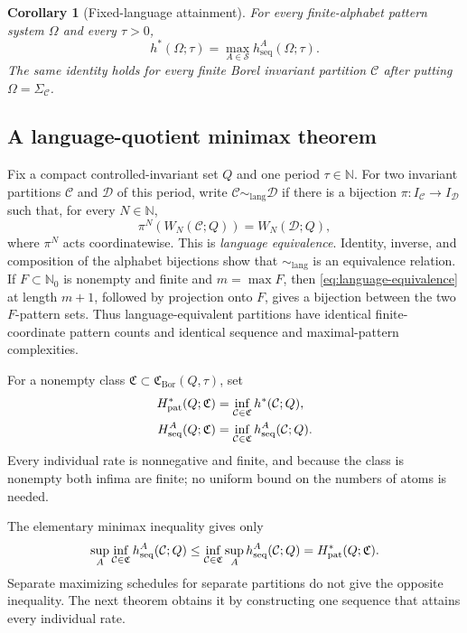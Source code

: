 \documentclass[11pt,reqno]{amsart}
\numberwithin{equation}{section}
\newtheorem{corollary}[theorem]{Corollary}
\theoremstyle{definition}
\newcommand{\N}{\mathbb N}
\newcommand{\Nzero}{\mathbb N_0}
\newcommand{\C}{\mathcal C}
\newcommand{\D}{\mathcal D}
\newcommand{\hseq}{h_{\mathrm{seq}}}
\newcommand{\hpat}{h^{*}}
\newcommand{\Bor}{\mathrm{Bor}}
\newcommand{\lang}{\mathrm{lang}}
\begin{document}
\begin{corollary}[Fixed-language attainment]\label{cor:fixed}
For every finite-alphabet pattern system $\Omega$ and every $\tau>0$,
\begin{equation}\label{eq:fixed-attainment}
 \hpat(\Omega;\tau)=\max_{A\in\mathscr S}\hseq^A(\Omega;\tau).
\end{equation}
The same identity holds for every finite Borel invariant partition $\C$ after
putting $\Omega=\Sigma_\C$.
\end{corollary}


\subsection{A language-quotient minimax theorem}\label{sec:minimax}

Fix a compact controlled-invariant set $Q$ and one period $\tau\in\N$.
For two invariant partitions $\C$ and $\D$ of this period, write
$\C\sim_{\lang}\D$ if there is a bijection
$\pi:I_\C\to I_\D$ such that, for every $N\in\N$,
\begin{equation}\label{eq:language-equivalence}
 \pi^N(W_N(\C;Q))=W_N(\D;Q),
\end{equation}
where $\pi^N$ acts coordinatewise.  This is \emph{language equivalence}.
Identity, inverse, and composition of the alphabet bijections show that
$\sim_{\lang}$ is an equivalence relation.  If $F\subset\Nzero$ is nonempty and finite and
$m=\max F$, then \eqref{eq:language-equivalence} at length $m+1$, followed by
projection onto $F$, gives a bijection between the two $F$-pattern sets.
Thus language-equivalent partitions have identical finite-coordinate pattern
counts and identical sequence and maximal-pattern complexities.

For a nonempty class $\mathfrak C\subset\mathfrak C_{\Bor}(Q,\tau)$, set
\begin{align}
 H_{\rm pat}^*(Q;\mathfrak C)
 &=\inf_{\C\in\mathfrak C}\hpat(\C;Q),
 \label{eq:system-pattern}\\
 H_{\rm seq}^A(Q;\mathfrak C)
 &=\inf_{\C\in\mathfrak C}\hseq^A(\C;Q).
 \label{eq:system-sequence}
\end{align}
Every individual rate is nonnegative and finite, and because the class is nonempty both
infima are finite; no uniform bound on the numbers of atoms is needed.

The elementary minimax inequality gives only
\begin{align*}
 \sup_A\inf_{\C\in\mathfrak C}\hseq^A(\C;Q)
 \le\inf_{\C\in\mathfrak C}\sup_A\hseq^A(\C;Q)
 =H_{\rm pat}^*(Q;\mathfrak C).
\end{align*}
Separate maximizing schedules for separate partitions do not give the
opposite inequality. The next theorem obtains it by constructing one
sequence that attains every individual rate.
\end{document}
